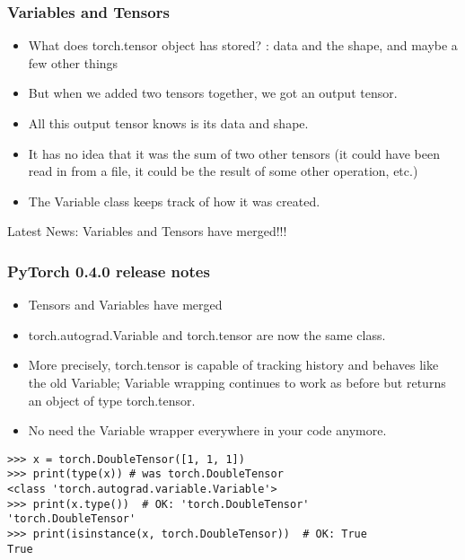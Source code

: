  
\begin{frame}[fragile]
\frametitle{Variables and Tensors}
\begin{itemize}
\item What does torch.tensor object has stored? : data and the shape, and maybe a few other things
\item But when we added two tensors together, we got an output tensor. 
\item All this output tensor knows is its data and shape. 
\item It has no idea that it was the sum of two other tensors (it could have been read in from a file, it could be the result of some other operation, etc.)
\item The Variable class keeps track of how it was created. 
\end{itemize}
Latest News: Variables and Tensors have merged!!!
 \end{frame} 
 
 
\begin{frame}[fragile]
\frametitle{PyTorch 0.4.0 release notes}
\begin{itemize}
\item Tensors and Variables have merged
\item torch.autograd.Variable and torch.tensor are now the same class. 
\item More precisely, torch.tensor is capable of tracking history and behaves like the old Variable; Variable wrapping continues to work as before but returns an object of type torch.tensor. \item No need the Variable wrapper everywhere in your code anymore.
\end{itemize}
 \begin{lstlisting}
>>> x = torch.DoubleTensor([1, 1, 1])
>>> print(type(x)) # was torch.DoubleTensor
<class 'torch.autograd.variable.Variable'>
>>> print(x.type())  # OK: 'torch.DoubleTensor'
'torch.DoubleTensor'
>>> print(isinstance(x, torch.DoubleTensor))  # OK: True
True
 \end{lstlisting}
 \end{frame} 
 
